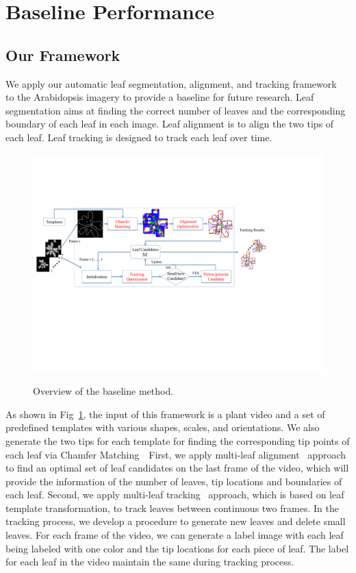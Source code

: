 \section{Baseline Performance}
\subsection{Our Framework}
We apply our automatic leaf segmentation, alignment, and tracking framework~\cite{yin2014a,yin2014b} to the Arabidopsis imagery to provide a baseline for future research.
Leaf segmentation aims at finding the correct number of leaves and the corresponding boundary of each leaf in each image.
Leaf alignment is to align the two tips of each leaf.
Leaf tracking is designed to track each leaf over time.

\begin{figure}[h]
\centering
\includegraphics[width=.98\textwidth]{Figures/overview}\\
\caption{Overview of the baseline method.}
\label{fig:methodOverview}
\end{figure}

As shown in Fig~\ref{fig:methodOverview}, the input of this framework is a plant video and a set of predefined templates with various shapes, scales, and orientations.
We also generate the two tips for each template for finding the corresponding tip points of each leaf via Chamfer Matching~\
First, we apply multi-leaf alignment~\cite{yin2014a} approach to find an optimal set of leaf candidates on the last frame of the video, which will provide the information of the number of leaves, tip locations and boundaries of each leaf.
Second, we apply multi-leaf tracking~\cite{yin2014b} approach, which is based on leaf template transformation, to track leaves between continuous two frames.
In the tracking process, we develop a procedure to generate new leaves and delete small leaves. 
For each frame of the video, we can generate a label image with each leaf being labeled with one color and the tip locations for each piece of leaf. 
The label for each leaf in the video maintain the same during tracking process. 


